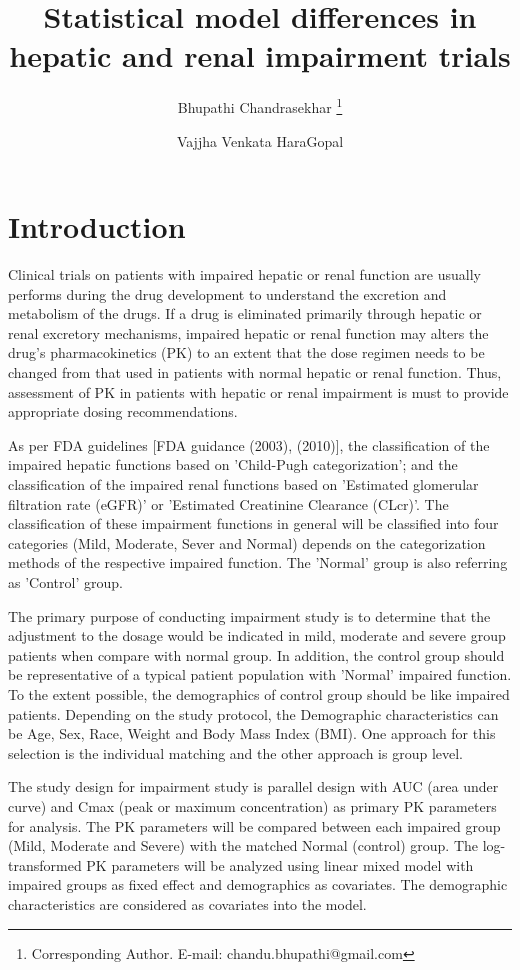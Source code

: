 \documentclass[final]{statistica}
\title[Model differences in organ imparied trials]{Statistical model differences in hepatic and renal impairment trials}
\author{Bhupathi Chandrasekhar \footnote{Corresponding Author. E-mail: chandu.bhupathi@gmail.com}}
\author[Bhupathi Chandrasekhar and V.V. Haragopal]{Vajjha Venkata HaraGopal}%
\begin{document}
%

\section{Introduction}

Clinical trials on patients with impaired hepatic or renal function are usually performs during the drug development to understand the excretion and metabolism of the drugs. If a drug is eliminated primarily through hepatic or renal excretory mechanisms, impaired hepatic or renal function may alters the drug's pharmacokinetics (PK) to an extent that the dose regimen needs to be changed from that used in patients with normal hepatic or renal function. Thus, assessment of PK in patients with hepatic or renal impairment is must to provide appropriate dosing recommendations.
\vspace{3mm}
\par
As per FDA guidelines [FDA guidance (2003), (2010)], the classification of the impaired hepatic functions based on 'Child-Pugh categorization'; and the classification of the impaired renal functions based on 'Estimated glomerular filtration rate (eGFR)' or 'Estimated Creatinine Clearance (CLcr)'. The classification of these impairment functions in general will be classified into four categories (Mild, Moderate, Sever and Normal) depends on the categorization methods of the respective impaired function. The 'Normal' group is also referring as 'Control' group.
\vspace{3mm}
\par
The primary purpose of conducting impairment study is to determine that the adjustment to the dosage would be indicated in mild, moderate and severe group patients when compare with normal group. In addition, the control group should be representative of a typical patient population with 'Normal' impaired function. To the extent possible, the demographics of control group should be like impaired patients. Depending on the study protocol, the Demographic characteristics can be Age, Sex, Race, Weight and Body Mass Index (BMI). One approach for this selection is the individual matching and the other approach is group level.
\vspace{3mm}
\par
The study design for impairment study is parallel design with AUC (area under curve) and Cmax (peak or maximum concentration) as primary PK parameters for analysis. The PK parameters will be compared between each impaired group (Mild, Moderate and Severe) with the matched Normal (control) group. The log-transformed PK parameters will be analyzed using linear mixed model with impaired groups as fixed effect and demographics as covariates. The demographic characteristics are considered as covariates into the model.
\end{document}
